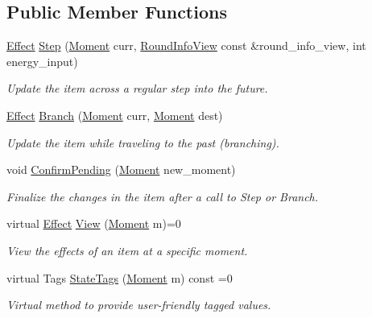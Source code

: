 \subsection*{Public Member Functions}
\begin{DoxyCompactItemize}
\item 
\hyperlink{classitem_1_1_effect}{Effect} \hyperlink{classitem_1_1_item_ad8d77979820782fd86a0a67e2ea25c75}{Step} (\hyperlink{classtimeplane_1_1_moment}{Moment} curr, \hyperlink{classroundinfo_1_1_round_info_view}{Round\+Info\+View} const \&round\+\_\+info\+\_\+view, int energy\+\_\+input)
\begin{DoxyCompactList}\small\item\em Update the item across a regular step into the future. \end{DoxyCompactList}\item 
\hyperlink{classitem_1_1_effect}{Effect} \hyperlink{classitem_1_1_item_aa4b1c982b6d35d047c7a8ea86b06be99}{Branch} (\hyperlink{classtimeplane_1_1_moment}{Moment} curr, \hyperlink{classtimeplane_1_1_moment}{Moment} dest)
\begin{DoxyCompactList}\small\item\em Update the item while traveling to the past (branching). \end{DoxyCompactList}\item 
void \hyperlink{classitem_1_1_item_a99eaccdd31a817a7cb0e501cb632f711}{Confirm\+Pending} (\hyperlink{classtimeplane_1_1_moment}{Moment} new\+\_\+moment)
\begin{DoxyCompactList}\small\item\em Finalize the changes in the item after a call to {\ttfamily Step} or {\ttfamily Branch}. \end{DoxyCompactList}\item 
virtual \hyperlink{classitem_1_1_effect}{Effect} \hyperlink{classitem_1_1_item_a400dfeabc4056d36bfd348ff9c51cf7d}{View} (\hyperlink{classtimeplane_1_1_moment}{Moment} m)=0
\begin{DoxyCompactList}\small\item\em View the effects of an item at a specific moment. \end{DoxyCompactList}\item 
virtual Tags \hyperlink{classitem_1_1_item_acc560ac68be4f5781cd90cddfd602942}{State\+Tags} (\hyperlink{classtimeplane_1_1_moment}{Moment} m) const =0
\begin{DoxyCompactList}\small\item\em Virtual method to provide user-\/friendly tagged values. \end{DoxyCompactList}\end{DoxyCompactItemize}
